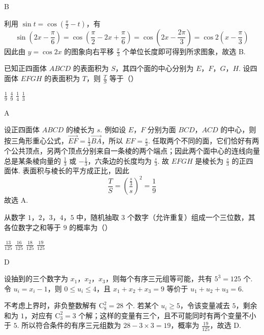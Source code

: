 \begin{answer}
B
\end{answer}

\begin{solution}
利用 \(\sin t=\cos\left(\frac\pi2-t\right)\)，有
\[
\sin\left(2x-\frac\pi6\right)=\cos\left(\frac\pi2-2x+\frac\pi6\right)=\cos\left(2x-\frac{2\pi}3\right)=\cos2\left(x-\frac\pi3\right)
\]
因此由 \(y=\cos2x\) 的图象向右平移 \(\frac\pi3\) 个单位长度即可得到所求图象，故选 B.
\end{solution}

\begin{problem}
已知正四面体 \(ABCD\) 的表面积为 \(S\)，其四个面的中心分别为 \(E\)，\(F\)，\(G\)，\(H\). 设四面体 \(EFGH\) 的表面积为 \(T\)，则 \(\frac{T}{S}\) 等于（\quad）

\choices
    {\( \frac{1}{9} \)}
    {\( \frac{4}{9} \)}
    {\( \frac{1}{4} \)}
    {\( \frac{1}{3} \)}
\end{problem}

\begin{answer}
A
\end{answer}

\begin{solution}
设正四面体 \(ABCD\) 的棱长为 \(s\). 例如设 \(E\)，\(F\) 分别为面 \(BCD\)，\(ACD\) 的中心，则按三角形重心公式，\(\overrightarrow{EF}=\frac13\overrightarrow{BA}\)，所以 \(EF=\frac{s}{3}\). 任取两个不同的面，它们恰好有两个公共顶点，另两个顶点分别来自一条棱的两个端点；因此两个面中心的连线向量总是某条棱向量的 \(\frac13\) 或 \(-\frac13\)，六条边的长度均为 \(\frac{s}{3}\). 故 \(EFGH\) 是棱长为 \(\frac{s}{3}\) 的正四面体. 表面积与棱长的平方成正比，因此
\[
\frac{T}{S}=\left(\frac{\frac{s}{3}}{s}\right)^2=\frac19
\]
故选 A.
\end{solution}

\begin{problem}
从数字 \(1\)，\(2\)，\(3\)，\(4\)，\(5\) 中，随机抽取 \(3\) 个数字（允许重复）组成一个三位数，其各位数字之和等于 \(9\) 的概率为（\quad）

\choices
    {\( \frac{13}{125} \)}
    {\( \frac{16}{125} \)}
    {\( \frac{18}{125} \)}
    {\( \frac{19}{125} \)}
\end{problem}

\begin{answer}
D
\end{answer}

\begin{solution}
设抽到的三个数字为 \(x_1\)，\(x_2\)，\(x_3\)，则每个有序三元组等可能，共有 \(5^3=125\) 个. 令 \(u_i=x_i-1\)，则 \(0\leqslant u_i\leqslant4\)，且 \(x_1+x_2+x_3=9\) 等价于 \(u_1+u_2+u_3=6\).

不考虑上界时，非负整数解有 \(\mathrm C_8^2=28\) 个. 若某个 \(u_i\geqslant5\)，令该变量减去 \(5\)，剩余和为 \(1\)，对应有 \(\mathrm C_3^2=3\) 个解；这样的变量有三个，且不可能同时有两个变量不小于 \(5\). 所以符合条件的有序三元组数为 \(28-3\times3=19\)，概率为 \(\frac{19}{125}\)，故选 D.
\end{solution}

